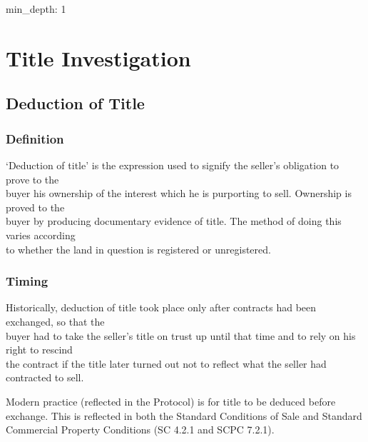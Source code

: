 \documentclass[
]{article}
\author{}
\date{}
\newenvironment{Shaded}{}{}
\newcommand{\NormalTok}[1]{#1}
\begin{document}
{
\setcounter{tocdepth}{3}
\tableofcontents
}
\begin{Shaded}
\begin{Highlighting}[]
\NormalTok{min\_depth: 1}
\end{Highlighting}
\end{Shaded}

\hypertarget{title-investigation}{%
\section{Title Investigation}\label{title-investigation}}

\hypertarget{deduction-of-title}{%
\subsection{Deduction of Title}\label{deduction-of-title}}

\hypertarget{definition}{%
\subsubsection{Definition}\label{definition}}

`Deduction of title' is the expression used to signify the seller's
obligation to prove to the\\
buyer his ownership of the interest which he is purporting to sell.
Ownership is proved to the\\
buyer by producing documentary evidence of title. The method of doing
this varies according\\
to whether the land in question is registered or unregistered.

\hypertarget{timing}{%
\subsubsection{Timing}\label{timing}}

Historically, deduction of title took place only after contracts had
been exchanged, so that the\\
buyer had to take the seller's title on trust up until that time and to
rely on his right to rescind\\
the contract if the title later turned out not to reflect what the
seller had contracted to sell.

Modern practice (reflected in the Protocol) is for title to be deduced
before exchange. This is reflected in both the Standard Conditions of
Sale and Standard Commercial Property Conditions (SC 4.2.1 and SCPC
7.2.1).
\end{document}
